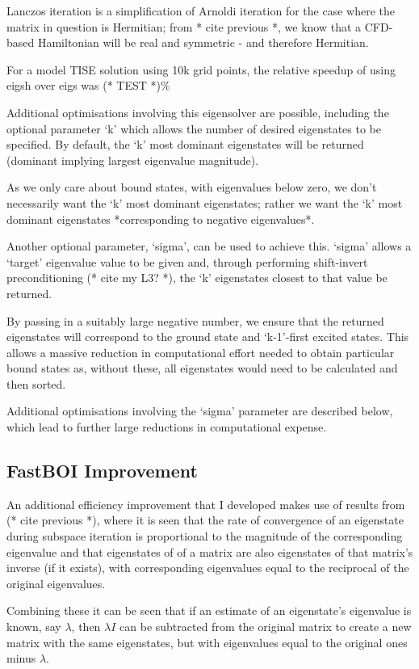 Lanczos iteration is a simplification of Arnoldi iteration for the case where the matrix in question is Hermitian; from * cite previous *, we know that a CFD-based Hamiltonian will be real and symmetric - and therefore Hermitian. 

For a model TISE solution using 10k grid points, the relative speedup of using eigsh over eigs was (* TEST *)\%

Additional optimisations involving this eigensolver are possible, including the optional parameter `k' which allows the number of desired eigenstates to be specified. By default, the `k' most dominant eigenstates will be returned (dominant implying largest eigenvalue magnitude). 

As we only care about bound states, with eigenvalues below zero, we don't necessarily want the `k' most dominant eigenstates; rather we want the `k' most dominant eigenstates *corresponding to negative eigenvalues*. 

Another optional parameter, `sigma', can be used to achieve this. `sigma' allows a `target' eigenvalue value to be given and, through performing shift-invert preconditioning (* cite my L3? *), the `k' eigenstates closest to that value be returned. 

By passing in a suitably large negative number, we ensure that the returned eigenstates will correspond to the ground state and `k-1'-first excited states. This allows a massive reduction in computational effort needed to obtain particular bound states as, without these, all eigenstates would need to be calculated and then sorted. 

Additional optimisations involving the `sigma' parameter are described below, which lead to further large reductions in computational expense.

\subsection{FastBOI Improvement}
An additional efficiency improvement that I developed makes use of results from (* cite previous *), where it is seen that the rate of convergence of an eigenstate during subspace iteration is proportional to the magnitude of the corresponding eigenvalue and that eigenstates of of a matrix are also eigenstates of that matrix's inverse (if it exists), with corresponding eigenvalues equal to the reciprocal of the original eigenvalues. 

Combining these it can be seen that if an estimate of an eigenstate's eigenvalue is known, say $\lambda$, then $\lambda I$ can be subtracted from the original matrix to create a new matrix with the same eigenstates, but with eigenvalues equal to the original ones minus $\lambda$. 

